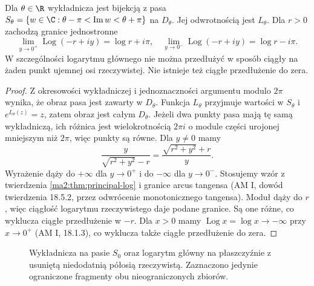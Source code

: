 \begin{wniosek}
\label{ma2:cor:log-strip}
Dla $\theta\in\R$ wykładnicza jest bijekcją z pasa
$S_\theta=\{w\in\C:\theta-\pi<\operatorname{Im}w<\theta+\pi\}$
na $D_\theta$. Jej odwrotnością jest $L_\theta$.
Dla $r>0$ zachodzą granice jednostronne
\[
 \lim_{y\to0^+}\operatorname{Log}(-r+iy)=\log r+i\pi,
 \quad
 \lim_{y\to0^-}\operatorname{Log}(-r+iy)=\log r-i\pi.
\]
W szczególności logarytmu głównego nie można przedłużyć
w sposób ciągły na żaden punkt ujemnej osi rzeczywistej.
Nie istnieje też ciągłe przedłużenie do zera.
\end{wniosek}
\begin{proof}
Z okresowości wykładniczej i jednoznaczności argumentu modulo
$2\pi$ wynika, że obraz pasa jest zawarty w $D_\theta$.
Funkcja $L_\theta$ przyjmuje wartości w $S_\theta$ i
$e^{L_\theta(z)}=z$, zatem obraz jest całym $D_\theta$.
Jeżeli dwa punkty pasa mają tę samą wykładniczą, ich różnica
jest wielokrotnością $2\pi i$ o module części urojonej
mniejszym niż $2\pi$, więc punkty są równe.
Dla $y\ne0$ mamy
\[
 \frac{y}{\sqrt{r^2+y^2}-r}
 =\frac{\sqrt{r^2+y^2}+r}{y}.
\]
Wyrażenie dąży do $+\infty$ dla $y\to0^+$ i do
$-\infty$ dla $y\to0^-$. Stosujemy wzór z twierdzenia
\ref{ma2:thm:principal-log} i granice arcus tangensa
(AM I, dowód twierdzenia 18.5.2, przez odwrócenie
monotonicznego tangensa). Moduł dąży do $r$, więc
ciągłość logarytmu rzeczywistego daje podane granice.
Są one różne, co wyklucza ciągłe przedłużenie w $-r$.
Dla $x>0$ mamy $\operatorname{Log}x=\log x\to-\infty$
przy $x\to0^+$ (AM I, 18.1.3), co wyklucza także
ciągłe przedłużenie do zera.
\end{proof}

\begin{figure}[htbp]
\centering
{}
\caption{Wykładnicza na pasie $S_0$ oraz logarytm główny na
płaszczyźnie z usuniętą niedodatnią półosią rzeczywistą.
Zaznaczono jedynie ograniczone fragmenty obu nieograniczonych zbiorów.}
\label{ma2:fig:log-strip}
\end{figure}

